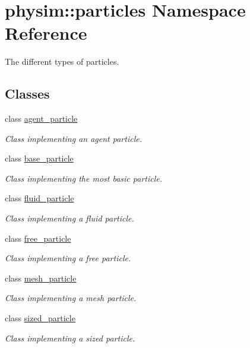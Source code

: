 \hypertarget{namespacephysim_1_1particles}{}\section{physim\+:\+:particles Namespace Reference}
\label{namespacephysim_1_1particles}


The different types of particles.  


\subsection*{Classes}
\begin{DoxyCompactItemize}
\item 
class \hyperlink{classphysim_1_1particles_1_1agent__particle}{agent\+\_\+particle}
\begin{DoxyCompactList}\small\item\em Class implementing an agent particle. \end{DoxyCompactList}\item 
class \hyperlink{classphysim_1_1particles_1_1base__particle}{base\+\_\+particle}
\begin{DoxyCompactList}\small\item\em Class implementing the most basic particle. \end{DoxyCompactList}\item 
class \hyperlink{classphysim_1_1particles_1_1fluid__particle}{fluid\+\_\+particle}
\begin{DoxyCompactList}\small\item\em Class implementing a fluid particle. \end{DoxyCompactList}\item 
class \hyperlink{classphysim_1_1particles_1_1free__particle}{free\+\_\+particle}
\begin{DoxyCompactList}\small\item\em Class implementing a free particle. \end{DoxyCompactList}\item 
class \hyperlink{classphysim_1_1particles_1_1mesh__particle}{mesh\+\_\+particle}
\begin{DoxyCompactList}\small\item\em Class implementing a mesh particle. \end{DoxyCompactList}\item 
class \hyperlink{classphysim_1_1particles_1_1sized__particle}{sized\+\_\+particle}
\begin{DoxyCompactList}\small\item\em Class implementing a sized particle. \end{DoxyCompactList}\end{DoxyCompactItemize}
